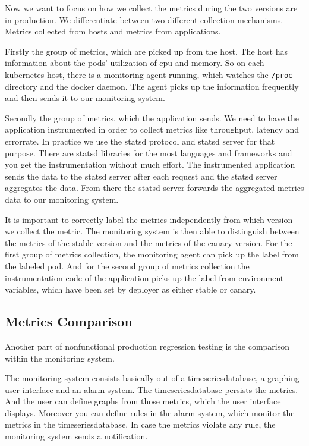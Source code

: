 Now we want to focus on how we collect the metrics during the two versions are in
production. We differentiate between two different collection mechanisms. Metrics
collected from hosts and metrics from applications.

Firstly the group of metrics, which are picked up from the host. The host has information
about the pods' utilization of cpu and memory. So on each kubernetes host, there is a
monitoring agent running, which watches the \verb!/proc! directory and the docker
daemon. The agent picks up the information frequently and then sends it to our monitoring
system.

Secondly the group of metrics, which the application sends. We need to have the
application instrumented in order to collect metrics like throughput, latency and
errorrate. In practice we use the statsd protocol and statsd server for that
purpose. There are statsd libraries for the most languages and frameworks and you get the
instrumentation without much effort. The instrumented application sends the data to the
statsd server after each request and the statsd server aggregates the data. From there the
statsd server forwards the aggregated metrics data to our monitoring system.

It is important to correctly label the metrics independently from which version we collect
the metric. The monitoring system is then able to distinguish between the metrics of the
stable version and the metrics of the canary version. For the first group of metrics
collection, the monitoring agent can pick up the label from the labeled pod. And for the
second group of metrics collection the instrumentation code of the application picks up
the label from environment variables, which have been set by deployer as either stable or
canary.
\subsection{Metrics Comparison}

Another part of nonfunctional production regression testing is the comparison within the
monitoring system.

The monitoring system consists basically out of a timeseriesdatabase, a graphing user
interface and an alarm system. The timeseriesdatabase persists the metrics. And the user
can define graphs from those metrics, which the user interface displays. Moreover you can
define rules in the alarm system, which monitor the metrics in the timeseriesdatabase.
In case the metrics violate any rule, the monitoring system sends a notification.

